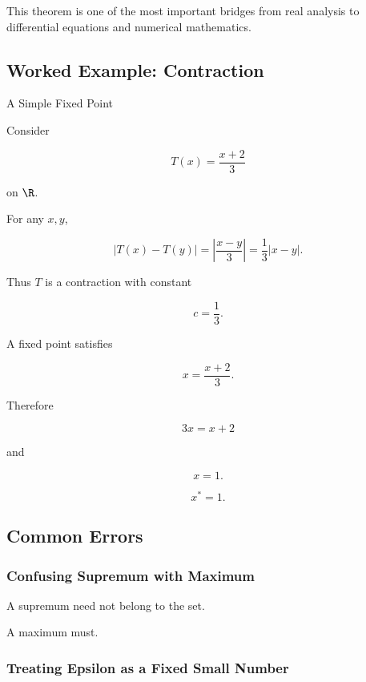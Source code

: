 This theorem is one of the most important bridges from real analysis to
differential equations and numerical mathematics.

\subsection{Worked Example: Contraction}
\label{subsec:worked-contraction}

\begin{workedexamplebox}{A Simple Fixed Point}

Consider

\[
T(x)=\frac{x+2}{3}
\]

on \(\R\).

For any \(x,y\),

\[
|T(x)-T(y)|
=
\left|
\frac{x-y}{3}
\right|
=
\frac13|x-y|.
\]

Thus \(T\) is a contraction with constant

\[
c=\frac13.
\]

A fixed point satisfies

\[
x=\frac{x+2}{3}.
\]

Therefore

\[
3x=x+2
\]

and

\[
x=1.
\]

\begin{answerbox}
\[
\boxed{
x^*=1.
}
\]
\end{answerbox}
\end{workedexamplebox}

\subsection{Common Errors}
\label{subsec:real-analysis-common-errors}

\subsubsection{Confusing Supremum with Maximum}

A supremum need not belong to the set.

A maximum must.

\subsubsection{Treating Epsilon as a Fixed Small Number}

